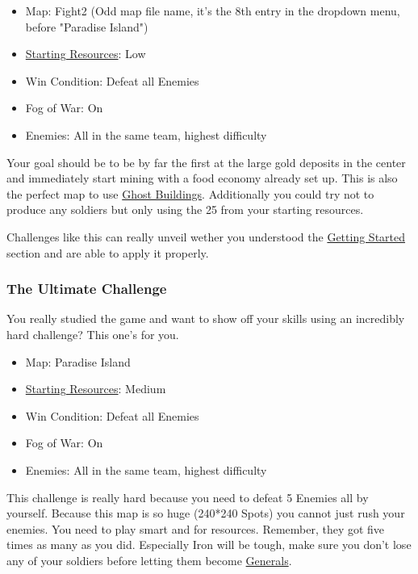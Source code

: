 \documentclass[12pt]{article}
\begin{document}
\begin{itemize}
    \item Map: Fight2 (Odd map file name, it's the 8th entry in the dropdown menu, before "Paradise Island")
    \item \hyperref[sec:startingresources]{Starting Resources}: Low
    \item Win Condition: Defeat all Enemies
    \item Fog of War: On
    \item Enemies: All in the same team, highest difficulty
\end{itemize}

Your goal should be to be by far the first at the large gold deposits in the center and immediately start mining with a food economy already set up. This is also the perfect map to use \hyperref[sec:ghostbuildings]{Ghost Buildings}. Additionally you could try not to produce any soldiers but only using the 25 from your starting resources.

Challenges like this can really unveil wether you understood the \hyperref[sec:gettingstarted]{Getting Started} section and are able to apply it properly.

\subsubsection{The Ultimate Challenge}
\label{sec:challenge_ultimate}

You really studied the game and want to show off your skills using an incredibly hard challenge? This one's for you.

\begin{itemize}
  \item Map: Paradise Island
  \item \hyperref[sec:startingresources]{Starting Resources}: Medium
  \item Win Condition: Defeat all Enemies
  \item Fog of War: On
  \item Enemies: All in the same team, highest difficulty
\end{itemize}

This challenge is really hard because you need to defeat 5 Enemies all by yourself. Because this map is so huge (240*240 Spots) you cannot just rush your enemies. You need to play smart and for resources. Remember, they got five times as many as you did. Especially Iron will be tough, make sure you don't lose any of your soldiers before letting them become \hyperref[sec:general]{Generals}.
\end{document}
